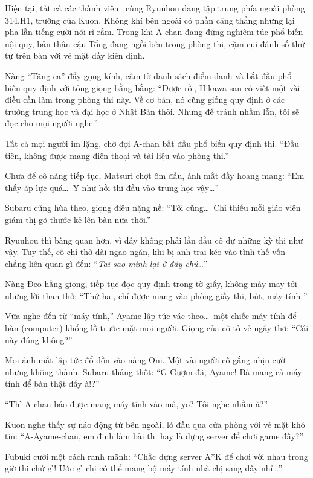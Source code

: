 \documentclass[../main.tex]{subfiles}
\begin{document}
Hiện tại, tất cả các thành viên \hll\ cùng Ryuuhou đang tập trung phía ngoài phòng 314.H1, trường của Kuon. Không khí bên ngoài có phần căng thẳng nhưng lại pha lẫn tiếng cười nói rì rầm. Trong khi A-chan đang đứng nghiêm túc phổ biến nội quy, bản thân cậu Tổng đang ngồi bên trong phòng thi, cặm cụi đánh số thứ tự trên bàn với vẻ mặt đầy kiên định.

Nàng ``Tăng ca'' đẩy gọng kính, cầm tờ danh sách điểm danh và bắt đầu phổ biến quy định với tông giọng bằng bằng: ``Được rồi, Hikawa-san có viết một vài điều cần làm trong phòng thi này. Về cơ bản, nó cũng giống quy định ở các trường trung học và đại học ở Nhật Bản thôi. Nhưng để tránh nhầm lẫn, tôi sẽ đọc cho mọi người nghe.''

Tất cả mọi người im lặng, chờ đợi A-chan bắt đầu phổ biến quy định thi. ``Đầu tiên, không được mang điện thoại và tài liệu vào phòng thi.''

Chưa để cô nàng tiếp tục, Matsuri chợt ôm đầu, ánh mắt đầy hoang mang: ``Em thấy áp lực quá\dots\ Y như hồi thi đầu vào trung học vậy\dots''

Subaru cũng hùa theo, giọng điệu nặng nề: ``Tôi cũng\dots\ Chỉ thiếu mỗi giáo viên giám thị gõ thước kẻ lên bàn nữa thôi.''

Ryuuhou thì bàng quan hơn, vì đây không phải lần đầu cô dự những kỳ thi như vậy. Tuy thế, cô chỉ thở dài ngao ngán, khi bị anh trai kéo vào tình thế vốn chẳng liên quan gì đến: ``\textit{Tại sao mình lại ở đây chứ\dots}''

Nàng Đeo hắng giọng, tiếp tục đọc quy định trong tờ giấy, không mảy may tới những lời than thở: ``Thứ hai, chỉ được mang vào phòng giấy thi, bút, máy tính-''

Vừa nghe đến từ ``máy tính,'' Ayame lập tức vác theo\dots\ một chiếc máy tính để bàn (computer) khổng lồ trước mặt mọi người. Giọng của cô tỏ vẻ ngây thơ: ``Cái này đúng không?''

Mọi ánh mắt lập tức đổ dồn vào nàng Oni. Một vài người cố gắng nhịn cười nhưng không thành. Subaru thảng thốt: ``G-Gượm đã, Ayame! Bà mang cả máy tính để bàn thật đấy à!?''

``Thì A-chan bảo được mang máy tính vào mà, yo? Tôi nghe nhầm à?''

Kuon nghe thấy sự náo động từ bên ngoài, ló đầu qua cửa phòng với vẻ mặt khó tin: ``A-Ayame-chan, em định làm bài thi hay là dựng server để chơi game đấy?''

Fubuki cười một cách ranh mãnh: ``Chắc dựng server A*K để chơi với nhau trong giờ thi chứ gì! Ước gì chị có thể mang bộ máy tính nhà chị sang đây nhỉ\dots''
\end{document}
